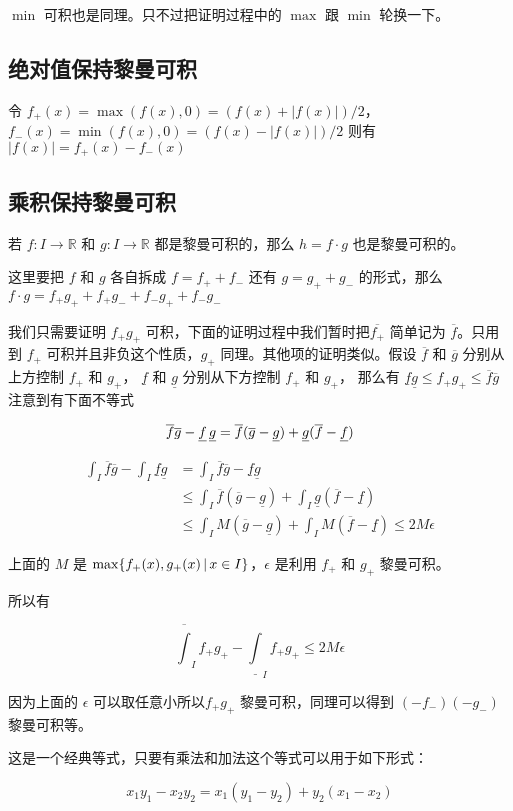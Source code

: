 $\min$ 可积也是同理。只不过把证明过程中的 $\max$ 跟 $\min$ 轮换一下。

\subsection{绝对值保持黎曼可积}

令 $f_{+}(x) = \max(f(x), 0) = (f(x) + \lvert f(x) \rvert) / 2$，$f_{-}(x) = \min(f(x), 0) = (f(x) - \lvert f(x) \rvert) / 2$
则有 $\lvert f(x) \rvert = f_{+}(x) - f_{-}(x)$

\subsection{乘积保持黎曼可积}

若 $f: I \to \mathbb{R}$ 和 $g: I \to \mathbb{R}$ 都是黎曼可积的，那么 $h = f \cdot g$ 也是黎曼可积的。

这里要把 $f$ 和 $g$ 各自拆成 $f = f_{+} + f_{-}$ 还有 $g = g_{+} + g_{-}$ 的形式，那么  $f \cdot g = f_{+}g_{+} + f_{+}g_{-} + f_{-}g_{+} +f_{-}g_{-} $

我们只需要证明 $f_{+}g_{+}$ 可积，下面的证明过程中我们暂时把$\overline{f_{+}}$ 简单记为 $\overline{f}$。只用到 $f_{+}$ 可积并且非负这个性质，$g_{+}$ 同理。其他项的证明类似。假设 $\overline{f}$ 和 $\overline{g}$ 分别从上方控制 $f_{+}$ 和 $g_{+}$， 
$\underline{f}$ 和 $\underline{g}$ 分别从下方控制 $f_{+}$ 和 $g_{+}$，
那么有 $ \underline{f} \underline{g} \le f_{+}g_{+} \le \overline{f} \overline{g}$ 注意到有下面不等式

\[
    \overline{f}\overline{g} - \underline{f} \, \underline{g} =  \overline{f}(\overline{g} - \underline{g}) + \underline{g}(\overline{f} - \underline{f}) \\
\]

\begin{align*}
    \int_{I}\overline{f}\overline{g} - \int_{I}\underline{f}\underline{g} &= \int_{I}\overline{f}\overline{g} - \underline{f}\underline{g} \\
    & \le \int_{I}\overline{f}(\overline{g} - \underline{g}) + \int_{I}\underline{g}(\overline{f} - \underline{f})  \\
    & \le \int_{I}M(\overline{g} - \underline{g}) + \int_{I}M(\overline{f} - \underline{f}) \le 2M\epsilon
\end{align*}

上面的 $M$ 是 $\max \{ f_{+}(x), g_{+}(x) \,\vert\, x \in I \}$，$\epsilon$ 是利用 $f_{+}$ 和 $g_{+}$ 黎曼可积。

所以有 

\[
    \overline{\int}_{I}f_{+}g_{+} - \underline{\int}_{I}f_{+}g_{+} \le 2 M \epsilon
\]

因为上面的 $\epsilon$ 可以取任意小所以$f_{+}g_{+}$ 黎曼可积，同理可以得到 $(-f_{-})(-g_{-})$ 黎曼可积等。

这是一个经典等式，只要有乘法和加法这个等式可以用于如下形式：

\[
    x_1y_1 - x_2y_2 = x_1(y_1 - y_2) + y_2(x_1 - x_2)
\]